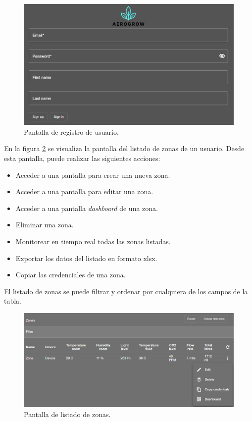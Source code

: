 \begin{figure}[H]
	\centering
	\includegraphics[width=.8\textwidth]{./Figures/Frontend formulario de creacion de nueva cuenta.png}
	\caption{Pantalla de registro de usuario.}
	\label{fig:formularioSignUp}
\end{figure}

En la figura \ref{fig:listaDeZonas} se visualiza la pantalla del listado de zonas de un usuario. Desde esta pantalla, puede realizar las siguientes acciones:

\begin{itemize}
	\item Acceder a una pantalla para crear una nueva zona.
	\item Acceder a una pantalla para editar una zona.
	\item Acceder a una pantalla \emph{dashboard} de una zona.
	\item Eliminar una zona.
	\item Monitorear en tiempo real todas las zonas listadas.
	\item Exportar los datos del listado en formato xlsx.
	\item Copiar las credenciales de una zona.
\end{itemize}

El listado de zonas se puede filtrar y ordenar por cualquiera de los campos de la tabla.

\begin{figure}[H]
	\centering
	\includegraphics[width=.9\textwidth]{./Figures/Frontend lista de zonas.png}
	\caption{Pantalla de listado de zonas.}
	\label{fig:listaDeZonas}
\end{figure}

